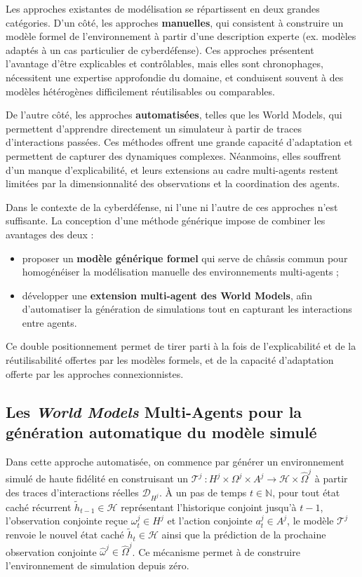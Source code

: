 Les approches existantes de modélisation se répartissent en deux grandes catégories.
D’un côté, les approches \textbf{manuelles}, qui consistent à construire un modèle formel de l’environnement à partir d’une description experte (ex. modèles  adaptés à un cas particulier de cyberdéfense). Ces approches présentent l’avantage d’être explicables et contrôlables, mais elles sont chronophages, nécessitent une expertise approfondie du domaine, et conduisent souvent à des modèles hétérogènes difficilement réutilisables ou comparables.

De l’autre côté, les approches \textbf{automatisées}, telles que les World Models, qui permettent d’apprendre directement un simulateur à partir de traces d’interactions passées. Ces méthodes offrent une grande capacité d’adaptation et permettent de capturer des dynamiques complexes. Néanmoins, elles souffrent d’un manque d’explicabilité, et leurs extensions au cadre multi-agents restent limitées par la dimensionnalité des observations et la coordination des agents.

Dans le contexte de la cyberdéfense, ni l’une ni l’autre de ces approches n’est suffisante. La conception d’une méthode générique impose de combiner les avantages des deux :
\begin{itemize}
    \item proposer un \textbf{modèle générique formel} qui serve de châssis commun pour homogénéiser la modélisation manuelle des environnements multi-agents ;
    \item développer une \textbf{extension multi-agent des World Models}, afin d’automatiser la génération de simulations tout en capturant les interactions entre agents.
\end{itemize}

Ce double positionnement permet de tirer parti à la fois de l’explicabilité et de la réutilisabilité offertes par les modèles formels, et de la capacité d’adaptation offerte par les approches connexionnistes.


\subsection{Les \textit{World Models} Multi-Agents pour la génération automatique du modèle simulé}

Dans cette approche automatisée, on commence par générer un environnement simulé de haute fidélité en construisant un  $\mathcal{T}^j~: H^j \times \Omega^j \times A^j \rightarrow \mathcal{H} \times \hat{\Omega}^j$ à partir des traces d'interactions réelles $\mathcal{D}_{H^j}$. À un pas de temps $t \in \mathbb{N}$, pour tout état caché récurrent $\tilde{h}_{t-1} \in \mathcal{H}$ représentant l'historique conjoint jusqu'à $t-1$, l'observation conjointe reçue $\omega_t^j \in H^j$ et l'action conjointe $a_t^j \in A^j$, le modèle $\mathcal{T}^j$ renvoie le nouvel état caché $\tilde{h}_t \in \mathcal{H}$ ainsi que la prédiction de la prochaine observation conjointe $\hat{\omega}^j \in \hat{\Omega}^j$. Ce mécanisme permet à  de construire l'environnement de simulation depuis zéro.

